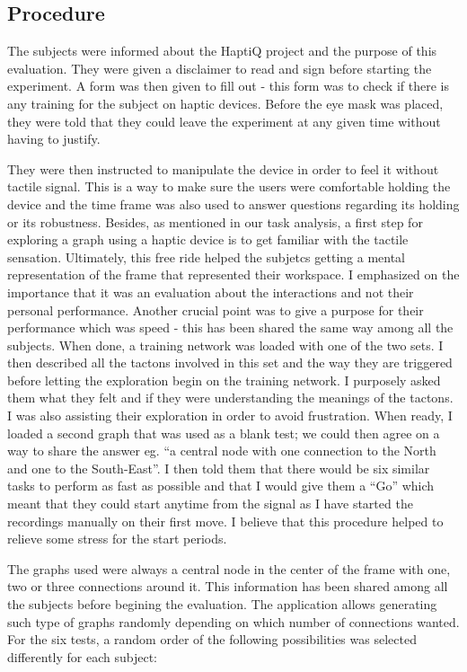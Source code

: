 \subsection{Procedure}\label{procedure}

The subjects were informed about the HaptiQ project and the purpose of
this evaluation. They were given a disclaimer to read and sign before
starting the experiment. A form was then given to fill out - this form
was to check if there is any training for the subject on haptic devices.
Before the eye mask was placed, they were told that they could leave the
experiment at any given time without having to justify.

They were then instructed to manipulate the device in order to feel it
without tactile signal. This is a way to make sure the users were
comfortable holding the device and the time frame was also used to
answer questions regarding its holding or its robustness. Besides, as
mentioned in our task analysis, a first step for exploring a graph using
a haptic device is to get familiar with the tactile sensation.
Ultimately, this free ride helped the subjetcs getting a mental
representation of the frame that represented their workspace. I
emphasized on the importance that it was an evaluation about the
interactions and not their personal performance. Another crucial point
was to give a purpose for their performance which was speed - this has
been shared the same way among all the subjects. When done, a training
network was loaded with one of the two sets. I then described all the
tactons involved in this set and the way they are triggered before
letting the exploration begin on the training network. I purposely asked
them what they felt and if they were understanding the meanings of the
tactons. I was also assisting their exploration in order to avoid
frustration. When ready, I loaded a second graph that was used as a
blank test; we could then agree on a way to share the answer eg. ``a
central node with one connection to the North and one to the
South-East''. I then told them that there would be six similar tasks to
perform as fast as possible and that I would give them a ``Go'' which
meant that they could start anytime from the signal as I have started
the recordings manually on their first move. I believe that this
procedure helped to relieve some stress for the start periods.

The graphs used were always a central node in the center of the frame
with one, two or three connections around it. This information has been
shared among all the subjects before begining the evaluation. The
application allows generating such type of graphs randomly depending on
which number of connections wanted. For the six tests, a random order of
the following possibilities was selected differently for each subject:

